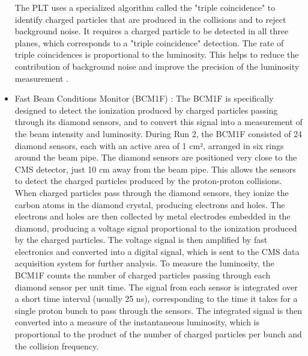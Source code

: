 \begin{itemize}
  The PLT uses a specialized algorithm called the "triple coincidence" to identify charged particles that are produced in the collisions and to reject background noise. It requires a charged particle to be detected in all three planes, which corresponds to a "triple coincidence" detection. The rate of triple coincidences is proportional to the luminosity. This helps to reduce the contribution of background noise and improve the precision of the luminosity measurement \cite{Lujan:2017kvh}.

\item Fast Beam Conditions Monitor (BCM1F) : The BCM1F is specifically designed to detect the ionization produced by charged particles passing through its diamond sensors, and to convert this signal into a measurement of the beam intensity and luminosity. During Run 2, the BCM1F consisted of 24 diamond sensors, each with an active area of 1 cm², arranged in six rings around the beam pipe. The diamond sensors are positioned very close to the CMS detector, just 10 cm away from the beam pipe. This allows the sensors to detect the charged particles produced by the proton-proton collisions. When charged particles pass through the diamond sensors, they ionize the carbon atoms in the diamond crystal, producing electrons and holes. The electrons and holes are then collected by metal electrodes embedded in the diamond, producing a voltage signal proportional to the ionization produced by the charged particles. The voltage signal is then amplified by fast electronics and converted into a digital signal, which is sent to the CMS data acquisition system for further analysis. To measure the luminosity, the BCM1F counts the number of charged particles passing through each diamond sensor per unit time. The signal from each sensor is integrated over a short time interval (usually 25 ns), corresponding to the time it takes for a single proton bunch to pass through the sensors. The integrated signal is then converted into a measure of the instantaneous luminosity, which is proportional to the product of the number of charged particles per bunch and the collision frequency.



\end{itemize}
